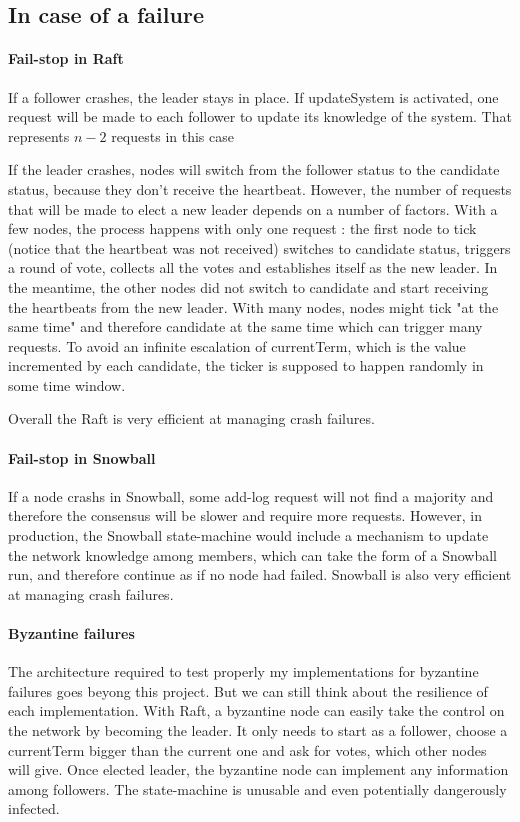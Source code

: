 \documentclass[11pt, twocolumn]{article}
\begin{document}
\subsection{In case of a failure}
\paragraph{Fail-stop in Raft}
If a follower crashes, the leader stays in place. If updateSystem is activated, one request will be made to each follower to update its knowledge of the system. That represents $n-2$ requests in this case

If the leader crashes, nodes will switch from the follower status to the candidate status, because they don't receive the heartbeat.
However, the number of requests that will be made to elect a new leader depends on a number of factors.
With a few nodes, the process happens with only one request : the first node to tick (notice that the heartbeat was not received) switches to candidate status, triggers a round of vote, collects all the votes and establishes itself as the new leader.
In the meantime, the other nodes did not switch to candidate and start receiving the heartbeats from the new leader.
With many nodes, nodes might tick "at the same time" and therefore candidate at the same time which can trigger many requests. To avoid an infinite escalation of currentTerm, which is the value incremented by each candidate, the ticker is supposed to happen randomly in some time window.

Overall the Raft is very efficient at managing crash failures.

\paragraph{Fail-stop in Snowball}
If a node crashs in Snowball, some add-log request will not find a majority and therefore the consensus will be slower and require more requests.
However, in production, the Snowball state-machine would include a mechanism to update the network knowledge among members, which can take the form of a Snowball run, and therefore continue as if no node had failed.
Snowball is also very efficient at managing crash failures.

\paragraph{Byzantine failures}
The architecture required to test properly my implementations for byzantine failures goes beyong this project. But we can still think about the resilience of each implementation.
With Raft, a byzantine node can easily take the control on the network by becoming the leader. It only needs to start as a follower, choose a currentTerm bigger than the current one and ask for votes, which other nodes will give.
Once elected leader, the byzantine node can implement any information among followers. The state-machine is unusable and even potentially dangerously infected.
\end{document}
